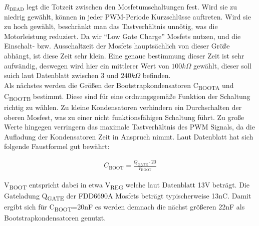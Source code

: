 $R_{\text{DEAD}}$ legt die Totzeit zwischen den Mosfetumschaltungen fest. Wird sie zu niedrig gewählt, können in jeder PWM-Periode Kurzschlüsse auftreten. Wird sie zu hoch
gewählt, beschränkt man das Tastverhältnis unnötig, was die Motorleistung reduziert. Da wir ``Low Gate Charge'' Mosfets nutzen, und die Einschalt- bzw. Ausschaltzeit
der Mosfets hauptsächlich von dieser Größe abhängt, ist diese Zeit sehr klein. Eine genaue bestimmung dieser Zeit ist sehr aufwändig, deswegen
wird hier ein mittlerer Wert von $100k\Omega$ gewählt, dieser soll suich laut Datenblatt zwischen 3 und $240k\Omega$ befinden.\\


%
% 
% 
% 



Als nächstes werden die Größen der Bootstrapkondensatoren C\textsubscript{BOOTA} und C\textsubscript{BOOTB} bestimmt. Diese sind für eine ordnungsgemäße
Funktion der Schaltung richtig zu wählen. Zu kleine Kondensatoren verhindern ein Durchschalten der oberen Mosfest, was zu einer nicht funktionsfähigen Schaltung
führt. Zu große Werte hingegen verringern das maximale Tastverhältnis des PWM Signals, da die Aufladung der Kondensatoren Zeit in Anspruch nimmt.
Laut Datenblatt hat sich folgende Faustformel gut bewährt:

\begin{align*}
C_{\text{BOOT}}=\frac{Q_{\text{GATE}}\cdot20}{V_{\text{BOOT}}}
\end{align*}


V\textsubscript{BOOT} entspricht dabei in etwa V\textsubscript{REG} welche laut Datenblatt 13V beträgt.
Die Gateladung Q\textsubscript{GATE} der FDD6690A Mosfets beträgt typischerweise 13nC. Damit ergibt sich für C\textsubscript{BOOT}=20nF es werden demnach
die nächst größeren 22nF als Bootstrapkondensatoren genutzt.\\

